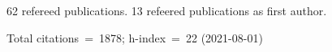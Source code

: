 62 refereed publications. 13 refeered publications as first author.

Total citations~=~1878; h-index~=~22 (2021-08-01)